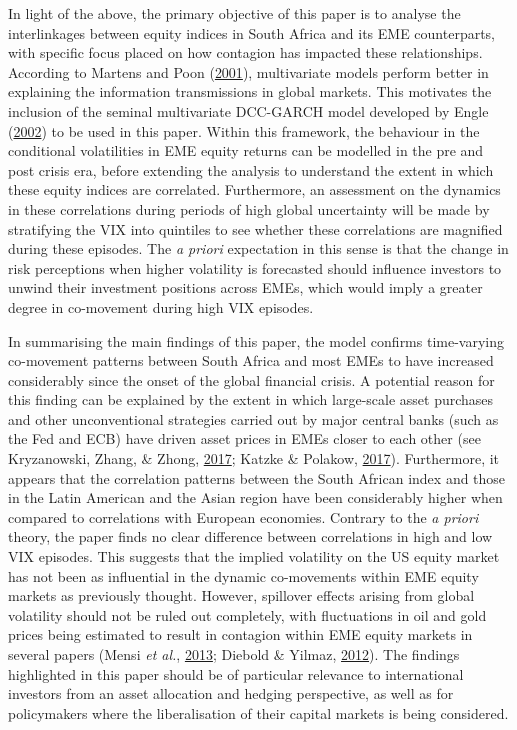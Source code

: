\documentclass[11pt,preprint, authoryear]{elsarticle}
\numberwithin{equation}{section}
\numberwithin{figure}{section}
\numberwithin{table}{section}
\begin{document}
In light of the above, the primary objective of this paper is to analyse
the interlinkages between equity indices in South Africa and its EME
counterparts, with specific focus placed on how contagion has impacted
these relationships. According to Martens and Poon
(\protect\hyperlink{ref-martens2001returns}{2001}), multivariate models
perform better in explaining the information transmissions in global
markets. This motivates the inclusion of the seminal multivariate
DCC-GARCH model developed by Engle
(\protect\hyperlink{ref-engle2002dynamic}{2002}) to be used in this
paper. Within this framework, the behaviour in the conditional
volatilities in EME equity returns can be modelled in the pre and post
crisis era, before extending the analysis to understand the extent in
which these equity indices are correlated. Furthermore, an assessment on
the dynamics in these correlations during periods of high global
uncertainty will be made by stratifying the VIX into quintiles to see
whether these correlations are magnified during these episodes. The
\emph{a priori} expectation in this sense is that the change in risk
perceptions when higher volatility is forecasted should influence
investors to unwind their investment positions across EMEs, which would
imply a greater degree in co-movement during high VIX episodes.

In summarising the main findings of this paper, the model confirms
time-varying co-movement patterns between South Africa and most EMEs to
have increased considerably since the onset of the global financial
crisis. A potential reason for this finding can be explained by the
extent in which large-scale asset purchases and other unconventional
strategies carried out by major central banks (such as the Fed and ECB)
have driven asset prices in EMEs closer to each other (see Kryzanowski,
Zhang, \& Zhong, \protect\hyperlink{ref-kryzanowski2017cross}{2017}; Katzke \& Polakow, 
\protect\hyperlink{ref-katzke2017carry}{2017}). Furthermore, it appears that the correlation patterns
between the South African index and those in the Latin American and the
Asian region have been considerably higher when compared to correlations
with European economies. Contrary to the \emph{a priori} theory, the
paper finds no clear difference between correlations in high and low VIX
episodes. This suggests that the implied volatility on the US equity
market has not been as influential in the dynamic co-movements within EME
equity markets as previously thought. However, spillover effects arising
from global volatility should not be ruled out completely, with
fluctuations in oil and gold prices being estimated to result in
contagion within EME equity markets in several papers (Mensi \emph{et al.},
\protect\hyperlink{ref-mensi2013correlations}{2013}; Diebold \& Yilmaz, 
\protect\hyperlink{ref-diebold2012better}{2012}). The findings highlighted in this paper should be of
particular relevance to international investors from an asset allocation
and hedging perspective, as well as for policymakers where the
liberalisation of their capital markets is being considered.
\end{document}
